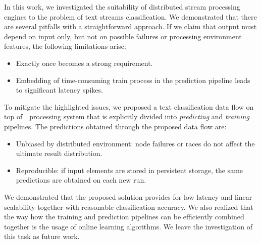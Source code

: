 \label {fs-conclusion}

In this work, we investigated the suitability of distributed stream processing engines to the problem of text streams classification. We demonstrated that there are several pitfalls with a straightforward approach. If we claim that output must depend on input only, but not on possible failures or processing environment features, the following limitations arise:

\begin{itemize}
    \item Exactly once becomes a strong requirement.
    \item Embedding of time-consuming train process in the prediction pipeline leads to significant latency spikes.
\end{itemize}

To mitigate the highlighted issues, we proposed a text classification data flow on top of~\FlameStream\ processing system that is explicitly divided into {\em predicting} and {\em training} pipelines. The predictions obtained through the proposed data flow are:

\begin{itemize}
    \item Unbiased by distributed environment: node failures or races do not affect the ultimate result distribution.
    \item Reproducible: if input elements are stored in persistent storage, the same predictions are obtained on each new run.
\end{itemize}

We demonstrated that the proposed solution provides for low latency and linear scalability together with reasonable classification accuracy. We also realized that the way how the training and prediction pipelines can be efficiently combined together is the usage of online learning algorithms. We leave the investigation of this task as future work.